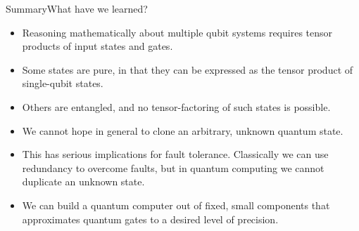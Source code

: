 \begin{frame}{Summary}{What have we learned?}

\begin{itemize}[<+->]
  \item Reasoning mathematically about multiple qubit systems requires tensor products of input states and gates.
  \item Some states are pure, in that they can be expressed as the tensor product of single-qubit states.
  \item Others are entangled, and no  tensor-factoring of such states is possible.
  \item We cannot hope in general to clone an arbitrary, unknown quantum state.
  \item This has serious implications for fault tolerance.  Classically we can use redundancy to overcome faults, but in quantum computing we cannot duplicate an unknown state.
  \item We can build a quantum computer out of fixed, small components that approximates quantum gates to a desired level of precision.
\end{itemize}
    
\end{frame}
